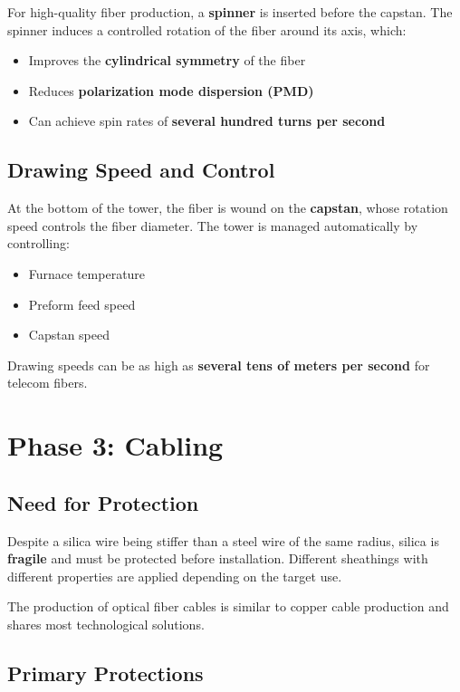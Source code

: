 \documentclass[a4paper, 11pt]{article}
\begin{document}
For high-quality fiber production, a \textbf{spinner} is inserted before the capstan. The spinner induces a controlled rotation of the fiber around its axis, which:

\begin{itemize}
    \item Improves the \textbf{cylindrical symmetry} of the fiber
    \item Reduces \textbf{polarization mode dispersion (PMD)}
    \item Can achieve spin rates of \textbf{several hundred turns per second}
\end{itemize}

\subsection{Drawing Speed and Control}

At the bottom of the tower, the fiber is wound on the \textbf{capstan}, whose rotation speed controls the fiber diameter. The tower is managed automatically by controlling:

\begin{itemize}
    \item Furnace temperature
    \item Preform feed speed
    \item Capstan speed
\end{itemize}

Drawing speeds can be as high as \textbf{several tens of meters per second} for telecom fibers.

\section{Phase 3: Cabling}

\subsection{Need for Protection}

Despite a silica wire being stiffer than a steel wire of the same radius, silica is \textbf{fragile} and must be protected before installation. Different sheathings with different properties are applied depending on the target use.

The production of optical fiber cables is similar to copper cable production and shares most technological solutions.

\subsection{Primary Protections}
\end{document}

